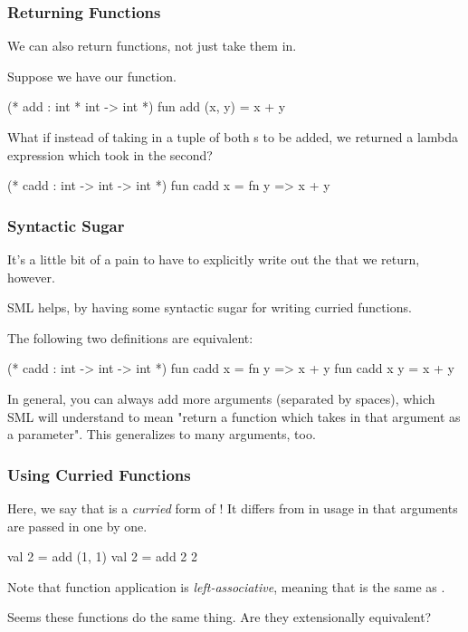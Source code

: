 \documentclass[aspectratio=169]{beamer}
\begin{document}
\begin{frame}[fragile]
  \frametitle{Returning Functions}

  We can also return functions, not just take them in. 


  Suppose we have our  function.

  \begin{codeblock}
    (* add : int * int -> int *)
    fun add (x, y) = x + y
  \end{codeblock}

  What if instead of taking in a tuple of both s to be added,
  we returned a lambda expression which took in the second?

  \begin{codeblock}
    (* cadd : int -> int -> int *)
    fun cadd x = fn y => x + y
  \end{codeblock}

\end{frame}

\begin{frame}[fragile]
  \frametitle{Syntactic Sugar}

  It's a little bit of a pain to have to explicitly write out the  
  that we return, however.

  SML helps, by having some syntactic sugar for writing curried functions. 

  The following two definitions are equivalent:
  \begin{codeblock}
    (* cadd : int -> int -> int *)
    fun cadd x = fn y => x + y
    fun cadd x y = x + y
  \end{codeblock}

  In general, you can always add more arguments (separated by spaces), which SML will
  understand to mean "return a function which takes in that argument as a parameter".
  This generalizes to many arguments, too.
\end{frame}

\begin{frame}[fragile]
  \frametitle{Using Curried Functions}

  Here, we say that  is a \textit{curried} form of !
  It differs from  in usage in that arguments are passed in one by one.

  \begin{codeblock}
    val 2 = add (1, 1)
    val 2 = add 2 2 
  \end{codeblock}

  Note that function application is \textit{left-associative}, meaning that 
   is the same as .

  Seems these functions do the same thing. Are they extensionally equivalent?
\end{frame}
\end{document}
